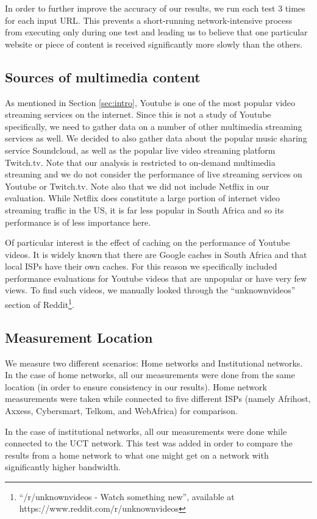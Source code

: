 \documentclass{sig-alternate-05-2015}
\begin{document}
In order to further improve the accuracy of our results, we run each test 3 times for each input URL. This prevents a short-running network-intensive process from executing only during one test and leading us to believe that one particular website or piece of content is received significantly more slowly than the others.

\subsection{Sources of multimedia content}
As mentioned in Section \ref{sec:intro}, Youtube is one of the most popular video streaming services on the internet. Since this is not a study of Youtube specifically, we need to gather data on a number of other multimedia streaming services as well. We decided to also gather data about the popular music sharing service Soundcloud, as well as the popular live video streaming platform Twitch.tv. Note that our analysis is restricted to on-demand multimedia streaming and we do not consider the performance of live streaming services on Youtube or Twitch.tv. Note also that we did not include Netflix in our evaluation. While Netflix does constitute a large portion of internet video streaming traffic in the US, it is far less popular in South Africa and so its performance is of less importance here.

Of particular interest is the effect of caching on the performance of Youtube videos. It is widely known that there are Google caches in South Africa and that local ISPs have their own caches. For this reason we specifically included performance evaluations for Youtube videos that are unpopular or have very few views. To find such videos, we manually looked through the ``unknownvideos'' section of Reddit\footnote{``/r/unknownvideos - Watch something new'', available at https://www.reddit.com/r/unknownvideos}.

\subsection{Measurement Location}
We measure two different scenarios: Home networks and Institutional networks. In the case of home networks, all our measurements were done from the same location (in order to ensure consistency in our results). Home network measurements were taken while connected to five different ISPs (namely Afrihost, Axxess, Cybersmart, Telkom, and WebAfrica) for comparison.

In the case of institutional networks, all our measurements were done while connected to the UCT network. This test was added in order to compare the results from a home network to what one might get on a network with significantly higher bandwidth.
\end{document}
